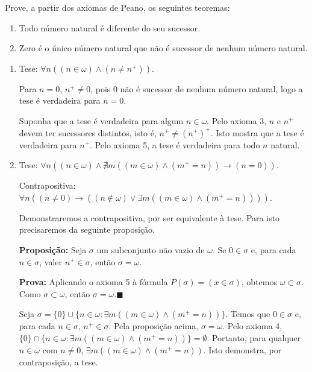 \begin{exercicio}
	Prove, a partir dos axiomas de Peano, os seguintes teoremas:
	\begin{enumerate}[label=(\alph{*})]
		\item Todo número natural é diferente do seu sucessor.
		\item Zero é o único número natural que não é sucessor de nenhum número natural.
	\end{enumerate}
\end{exercicio}
\begin{solucao}
	\begin{enumerate}[label=(\alph{*})]
		\item Tese: $\forall n((n\in\omega)\wedge(n\neq n^+))$.
		
		Para $n=0$, $n^+\neq0$, pois $0$ não é sucessor de nenhum número natural, logo a tese é verdadeira para $n=0$.
		
		Suponha que a tese é verdadeira para algum $n\in\omega$. Pelo axioma 3, $n$ e $n^+$ devem ter sucessores distintos, isto é, $n^+\neq(n^+)^+$. Isto mostra que a tese é verdadeira para $n^+$. Pelo axioma 5, a tese é verdadeira para todo $n$ natural.
		
		\item Tese: $\forall n((n\in\omega)\wedge\nexists m((m\in\omega)\wedge(m^+=n))\to(n=0))$.
		
		Contrapositiva: $\forall n((n\neq0)\to((n\notin\omega)\vee\exists m((m\in\omega)\wedge(m^+=n))))$.
		
		Demonstraremos a contrapositiva, por ser equivalente à tese. Para isto precisaremos da seguinte proposição.
		
		\textbf{Proposição:} Seja $\sigma$ um subconjunto não vazio de $\omega$. Se $0\in\sigma$ e, para cada $n\in\sigma$, valer $n^+\in\sigma$, então $\sigma=\omega$.
		
		\textbf{Prova:} Aplicando o axioma 5 à fórmula $P(\sigma)=(x\in\sigma)$, obtemos $\omega\subset \sigma$. Como $\sigma\subset \omega$, então $\sigma=\omega$.\hfill$\blacksquare$
		
		Seja $\sigma=\{0\}\cup\{n\in\omega:\exists m((m\in\omega)\wedge(m^+=n))\}$. Temos que $0\in\sigma$ e, para cada $n\in\sigma$, $n^+\in\sigma$. Pela proposição acima, $\sigma=\omega$. Pelo axioma 4, $\{0\}\cap\{n\in\omega:\exists m((m\in\omega)\wedge(m^+=n))\}=\emptyset$. Portanto, para qualquer $n\in\omega$ com $n\neq0$, $\exists m((m\in\omega)\wedge(m^+=n))$. Isto demonstra, por contraposição, a tese.
	\end{enumerate}
\end{solucao}

